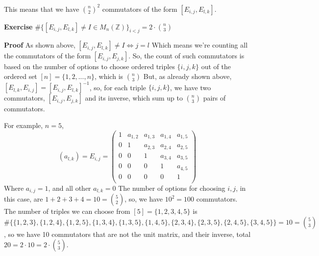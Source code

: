 \documentclass[12pt]{article}
\begin{document}
This means that we have \( {n \choose 2}^2 \) commutators of the form \( [E_{i,j},E_{l,k}] \).

\textbf{Exercise} \newline
\( \#\{ [E_{i,j},E_{l,k}] \neq I \in M_{n}(\mathbb{Z}) \}_{i<j}=2 \cdot {n \choose 3} \) \newline

\textbf{Proof} \newline
As shown above, \( [E_{i,j},E_{l,k}] \neq I \Leftrightarrow j = l \) \newline
Which means we're counting all the commutators of the form \( [E_{i,j},E_{j,k}] \). \newline
So, the count of such commutators is based on the number of options to choose \newline
ordered triples \( \{i,j,k\} \) out of the ordered set \( [n]=\{1,2,...,n\} \), which is \( {n \choose 3} \) \newline
But, as already shown above, \( [E_{l,k},E_{i,j}]=[E_{i,j},E_{l,k}]^{-1} \), so, for each triple \( \{i,j,k\} \), we have
two commutators, \( [E_{i,j},E_{j,k}] \) and its inverse, which sum up to \( {n \choose 3} \) pairs of commutators. \newline

For example, \( n=5 \), \newline
$$ (a_{l,k})=E_{i,j}=\begin{pmatrix} 
	1 & a_{1,2} & a_{1,3} & a_{1,4} & a_{1,5} \\
	0 & 1 & a_{2,3} & a_{2,4} & a_{2,5} \\
	0 & 0 & 1 & a_{3,4} & a_{3,5} \\
	0 & 0 & 0 & 1 & a_{4,5} \\
	0 & 0 & 0 & 0 & 1 \\
\end{pmatrix} 
$$
Where \( a_{i,j}=1\), and all other \( a_{l,k}=0 \) \newline
The number of options for choosing \( i,j \), in this case, are \( 1+2+3+4=10={5 \choose 2} \), \newline
so, we have \( 10^2=100 \) commutators. 
The number of triples we can choose from \( [5]=\{1,2,3,4,5\} \) is \newline
\( \#\{\{1,2,3\},\{1,2,4\},\{1,2,5\},\{1,3,4\},\{1,3,5\},\{1,4,5\},\{2,3,4\},\{2,3,5\},\{2,4,5\},\{3,4,5\}\}=10={5 \choose 3} \), \newline
so we have 10 commutators that are not the unit matrix, and their inverse, total \( 20 = 2 \cdot 10=2 \cdot {5 \choose 3} \). \newline
\end{document}
